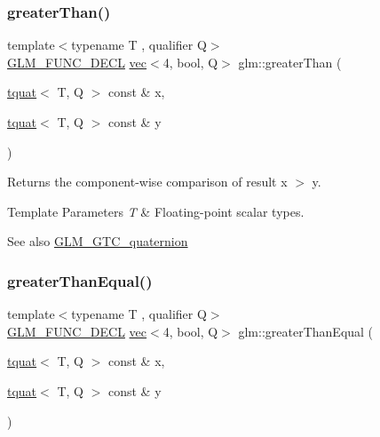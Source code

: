 \subsubsection{\texorpdfstring{greater\+Than()}{greaterThan()}}
{\footnotesize\ttfamily template$<$typename T , qualifier Q$>$ \\
\hyperlink{setup_8hpp_ab2d052de21a70539923e9bcbf6e83a51}{G\+L\+M\+\_\+\+F\+U\+N\+C\+\_\+\+D\+E\+CL} \hyperlink{structglm_1_1vec}{vec}$<$4, bool, Q$>$ glm\+::greater\+Than (\begin{DoxyParamCaption}\item[{\hyperlink{structglm_1_1tquat}{tquat}$<$ T, Q $>$ const \&}]{x,  }\item[{\hyperlink{structglm_1_1tquat}{tquat}$<$ T, Q $>$ const \&}]{y }\end{DoxyParamCaption})}

Returns the component-\/wise comparison of result x $>$ y.


\begin{DoxyTemplParams}{Template Parameters}
{\em T} & Floating-\/point scalar types.\\
\hline
\end{DoxyTemplParams}
\begin{DoxySeeAlso}{See also}
\hyperlink{group__gtc__quaternion}{G\+L\+M\+\_\+\+G\+T\+C\+\_\+quaternion} 
\end{DoxySeeAlso}
\mbox{\label{group__gtc__quaternion_ga293cb3175d9ad290deaf50984716fd44}} 
\subsubsection{\texorpdfstring{greater\+Than\+Equal()}{greaterThanEqual()}}
{\footnotesize\ttfamily template$<$typename T , qualifier Q$>$ \\
\hyperlink{setup_8hpp_ab2d052de21a70539923e9bcbf6e83a51}{G\+L\+M\+\_\+\+F\+U\+N\+C\+\_\+\+D\+E\+CL} \hyperlink{structglm_1_1vec}{vec}$<$4, bool, Q$>$ glm\+::greater\+Than\+Equal (\begin{DoxyParamCaption}\item[{\hyperlink{structglm_1_1tquat}{tquat}$<$ T, Q $>$ const \&}]{x,  }\item[{\hyperlink{structglm_1_1tquat}{tquat}$<$ T, Q $>$ const \&}]{y }\end{DoxyParamCaption})}

